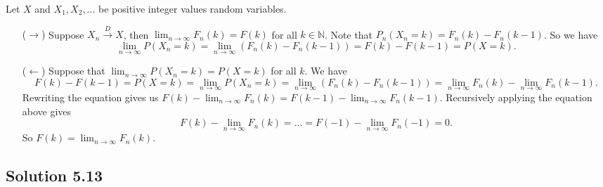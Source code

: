 Let $X$ and $X_1, X_2, ...$ be positive integer values random variables.
\begin{itemize}
    \item[($\rightarrow$)] Suppose $X_n \xrightarrow{D} X$, then $\lim_{n \to \infty} F_n(k) = F(k)$ for all $k \in \mathbb{N}$.
        Note that $P_n(X_n = k) = F_n(k) - F_n(k - 1)$.
        So we have
        \begin{equation*}
            \lim_{n \to \infty} P(X_n = k) = \lim_{n \to \infty} (F_n(k) - F_n(k - 1))
                = F(k) - F(k - 1)
                = P(X = k).
        \end{equation*}
    \item[($\leftarrow$)] Suppose that $\lim_{n \to \infty} P(X_n = k) = P(X = k)$ for all $k$.
        We have
        \begin{equation*}
            F(k) - F(k - 1) = P(X = k)
                = \lim_{n \to \infty} P(X_n = k)
                = \lim_{n \to \infty} (F_n(k) - F_n(k - 1))
                = \lim_{n \to \infty} F_n(k) - \lim_{n \to \infty} F_n(k - 1).
        \end{equation*}
        Rewriting the equation gives us $F(k) - \lim_{n \to \infty} F_n(k) = F(k - 1) - \lim_{n \to \infty} F_n(k - 1)$.
        Recursively applying the equation above gives
        \begin{equation*}
            F(k) - \lim_{n \to \infty} F_n(k) = ...
                = F(-1) - \lim_{n \to \infty} F_n(-1)
                = 0.
        \end{equation*}
        So $F(k) = \lim_{n \to \infty} F_n(k)$.
\end{itemize}


\subsection*{Solution 5.13}

